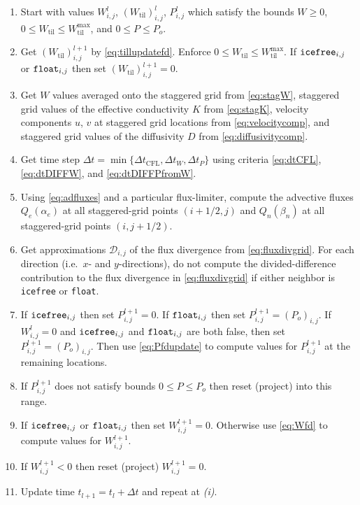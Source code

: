 \documentclass[gmd]{copernicus}   %
\newcommand{\text}{\textrm}
\newcommand{\Wtil}{W_{\text{til}}}
\newcommand{\Wtilmax}{W_{\text{til}}^{\text{max}}}
\newcommand{\Wlij}{W^l_{i,j}}
\newcommand{\Plij}{P^l_{i,j}}
\begin{document}
\renewcommand{\labelenumi}{\emph{(\roman{enumi})}}
\begin{enumerate}
\item Start with values $\Wlij$, $(\Wtil)_{i,j}^l$, $\Plij$ which satisfy the bounds $W\ge 0$, $0\le \Wtil \le \Wtilmax$, and $0 \le P \le P_o$.
\item Get $(\Wtil)_{i,j}^{l+1}$ by \eqref{eq:tillupdatefd}.  Enforce $0\le \Wtil \le \Wtilmax$.  If $\text{\texttt{icefree}}_{i,j}$ or $\text{\texttt{float}}_{i,j}$ then set $(\Wtil)_{i,j}^{l+1}=0$.
\item Get $W$ values averaged onto the staggered grid from \eqref{eq:stagW}, staggered grid values of the effective conductivity $K$ from \eqref{eq:stagK}, velocity components $u$, $v$ at staggered grid locations from \eqref{eq:velocitycomp}, and staggered grid values of the diffusivity $D$ from \eqref{eq:diffusivitycomp}.
\item Get time step $\Delta t = \min\{\Delta t_{\text{CFL}}, \Delta t_W, \Delta t_P\}$ using criteria \eqref{eq:dtCFL}, \eqref{eq:dtDIFFW}, and \eqref{eq:dtDIFFPfromW}.
\item Using \eqref{eq:adfluxes} and a particular flux-limiter, compute the advective fluxes $Q_e(\alpha_e)$ at all staggered-grid points $(i+1/2,j)$ and $Q_n(\beta_n)$ at all staggered-grid points $(i,j+1/2)$.
\item Get approximations $\mathcal{D}_{i,j}$ of the flux divergence from \eqref{eq:fluxdivgrid}.  For each direction (i.e.~$x$- and $y$-directions), do not compute the divided-difference contribution to the flux divergence in \eqref{eq:fluxdivgrid} if either neighbor is \texttt{icefree} or \texttt{float}.
\item If $\text{\texttt{icefree}}_{i,j}$ then set $P_{i,j}^{l+1}=0$.  If $\text{\texttt{float}}_{i,j}$ then set $P_{i,j}^{l+1} = (P_o)_{i,j}$.  If $\Wlij=0$ and $\text{\texttt{icefree}}_{i,j}$ and $\text{\texttt{float}}_{i,j}$ are both false, then set $P_{i,j}^{l+1} = (P_o)_{i,j}$.  Then use \eqref{eq:Pfdupdate} to compute values for $P_{i,j}^{l+1}$ at the remaining locations.
\item If $P_{i,j}^{l+1}$ does not satisfy bounds $0 \le P \le P_o$ then reset (project) into this range.
\item If $\text{\texttt{icefree}}_{i,j}$ or $\text{\texttt{float}}_{i,j}$ then set $W_{i,j}^{l+1}=0$.  Otherwise use \eqref{eq:Wfd} to compute values for $W_{i,j}^{l+1}$.
\item If $W_{i,j}^{l+1}<0$ then reset (project) $W_{i,j}^{l+1}=0$.
\item Update time $t_{l+1}=t_l+\Delta t$ and repeat at \emph{(i)}.
\end{enumerate}
\end{document}
